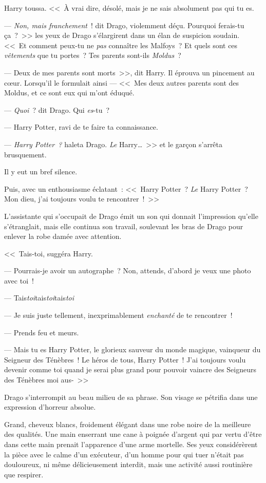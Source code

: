 Harry toussa.
<<~À vrai dire, désolé, mais je ne sais absolument pas qui tu es.

--- \emph{Non, mais franchement}~! dit Drago, violemment déçu. Pourquoi ferais-tu ça~?~>> les yeux de Drago s'élargirent dans un élan de suspicion soudain. <<~Et comment peux-tu ne \emph{pas} connaître les Malfoys~? Et quels sont ces \emph{vêtements} que tu portes~? Tes parents sont-ils \emph{Moldus}~?

--- Deux de mes parents sont morts~>>, dit Harry. Il éprouva un pincement au cœur. Lorsqu'il le formulait ainsi — <<~Mes deux autres parents sont des Moldus, et ce sont eux qui m'ont éduqué.

--- \emph{Quoi}~? dit Drago. Qui \emph{es}-tu~?

--- Harry Potter, ravi de te faire ta connaissance.

--- \emph{Harry Potter~?} haleta Drago. \emph{Le} Harry…~>> et le garçon s'arrêta brusquement.

Il y eut un bref silence.

Puis, avec un enthousiasme éclatant~: <<~Harry Potter~? \emph{Le} Harry Potter~? Mon dieu, j'ai toujours voulu te rencontrer~!~>>

L'assistante qui s'occupait de Drago émit un son qui donnait l'impression qu'elle s'étranglait, mais elle continua son travail, soulevant les bras de Drago pour enlever la robe damée avec attention.

<<~Tais-toi, suggéra Harry.

--- Pourrais-je avoir un autographe~? Non, attends, d'abord je veux une photo avec toi~!

--- Tais\emph{toi}tais\emph{toi}tais\emph{toi}

--- Je suis juste tellement, inexprimablement \emph{enchanté} de te rencontrer~!

--- Prends feu et meurs.

--- Mais tu es Harry Potter, le glorieux sauveur du monde magique, vainqueur du Seigneur des Ténèbres~! Le héros de tous, Harry Potter~! J'ai toujours voulu devenir comme toi quand je serai plus grand pour pouvoir vaincre des Seigneurs des Ténèbres moi aus-~>>

Drago s'interrompit au beau milieu de sa phrase. Son visage se pétrifia dans une expression d'horreur absolue.

Grand, cheveux blancs, froidement élégant dans une robe noire de la meilleure des qualités. Une main enserrant une cane à poignée d'argent qui par vertu d'être dans cette main prenait l'apparence d'une arme mortelle. Ses yeux considérèrent la pièce avec le calme d'un exécuteur, d'un homme pour qui tuer n'était pas douloureux, ni même délicieusement interdit, mais une activité aussi routinière que respirer.


